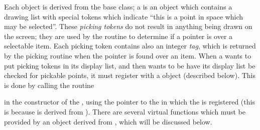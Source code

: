 Each  object is derived from the  base class; a  is an object which contains a drawing list with special  tokens which indicate ``this is a point in space which may be selected''.  These {\em picking tokens} do not result in anything being drawn on the screen; they are used by the  routine to determine if a pointer is over a selectable item.  Each picking token contains also an integer {\em tag}, which is returned by the picking routine when the pointer is found over an item.  When a  wants to put picking tokens in its display list, and then wants to be have its display list be checked for pickable points, it must register with a  object (described below).  This is done by calling the routine
\begin{center}
\end{center}
in the constructor of the , using the pointer to the  in which the  is registered (this is because  is derived from ).  There are several virtual functions which must be provided by an object derived from , which will be discussed below.

